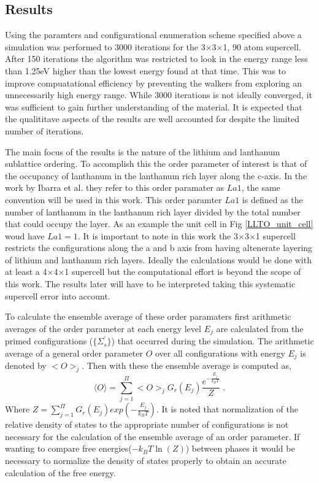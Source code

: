 \documentclass[aps,prl,reprint,superscriptaddress,showkeys]{revtex4-1}
\begin{document}
\subsection{Results}
  Using the paramters and configurational enumeration scheme specified above a simulation was performed to 3000 iterations for  the 3$\times$3$\times$1,  90 atom supercell. After 150 iterations the algorithm was restricted to look  in the energy range less than 1.25eV higher than the lowest energy found at that time. This was to improve compuatational efficiency by preventing the walkers from exploring an unnecessarily high energy range. While 3000 iterations is not ideally converged, it was sufficient to gain further understanding of the material. It is expected that the qualititave aspects of the results are well accounted for despite the limited number of iterations. 
  
The main focus of the results is the nature of the lithium and lanthanum sublattice ordering. To accomplish this the order parameter of interest is that of the occupancy of lanthanum in the lanthanum rich layer along the c-axis.  In the work by Ibarra et al. \cite{P4mmmstrucuture} they refer to this order paramater as $La1$, the same convention will be used in this work. This order paramter $La1$ is defined as the number of lanthanum in the lanthanum rich layer divided by the total number that could occupy the layer. As an example the unit cell in Fig \ref{LLTO_unit_cell} woud have $La1=1$. It is important to note in this work the 3$\times$3$\times$1 supercell restricts the configurations along the a and b axis from having altenerate layering of lithium and lanthanum rich layers. Ideally the calculations would be done with at least a 4$\times$4$\times$1 supercell but the computational effort is beyond the scope of this work. The results later will have to be interpreted taking this systematic supercell error into account.  
  
To calculate the ensemble average of these order paramaters first arithmetic averages of the order parameter at each energy level $E_j$ are calculated from the primed configurations ($\{\Sigma_s ^{'}\}$) that occurred during the simulation. The arithmetic average of a general order parameter $O$ over all configurations with energy $E_j$ is denoted by $< O >_j$. Then with these the ensemble average is computed as, 
  \begin{equation}
  \langle O \rangle  =  \sum_{j=1}^{\Pi}< O >_j G_r(E_j) \frac{e^{-\frac{E_j}{k_BT}}}{Z} \;.
  \label{ensembleaverage}
  \end{equation}
  Where $Z= \sum_{j=1}^{\Pi} G_r(E_j) exp(-\frac{E_j}{k_BT})$. 
It is noted that normalization of the relative density of states to the appropriate number of configurations is not necessary for the calculation of the ensemble average of an order parameter. If wanting to compare free energies($-k_BT\ln(Z)$) between phases it would be necessary to normalize the density of states properly to obtain an accurate calculation of the free energy. 
\end{document}
